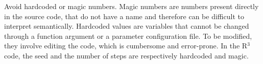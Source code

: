 \documentclass[a4paper,11pt]{article}
\begin{document}
Avoid hardcoded or magic numbers. Magic numbers are numbers present directly in the source code, that do not have a name and therefore can be difficult to interpret semantically. Hardcoded values are variables that cannot be changed through a function argument or a parameter configuration file. To be modified, they involve editing the code, which is cumbersome and error-prone. In the R$^3$ code, the seed and the number of steps are respectively hardcoded and magic.\\

%
\end{document}
